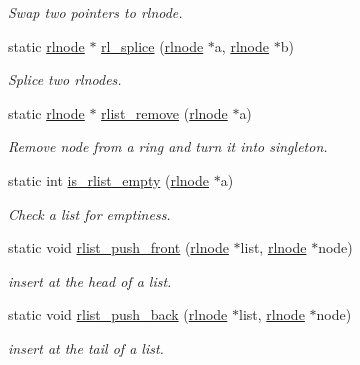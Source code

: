 \begin{DoxyCompactItemize}
\begin{DoxyCompactList}\small\item\em Swap two pointers to rlnode. \end{DoxyCompactList}\item 
static \hyperlink{group__rlists_ga8f6244877f7ce2322c90525217ea6e7a}{rlnode} $\ast$ \hyperlink{group__rlists_gac04dfecc68239457f673c0a63c254541}{rl\+\_\+splice} (\hyperlink{group__rlists_ga8f6244877f7ce2322c90525217ea6e7a}{rlnode} $\ast$a, \hyperlink{group__rlists_ga8f6244877f7ce2322c90525217ea6e7a}{rlnode} $\ast$b)
\begin{DoxyCompactList}\small\item\em Splice two rlnodes. \end{DoxyCompactList}\item 
static \hyperlink{group__rlists_ga8f6244877f7ce2322c90525217ea6e7a}{rlnode} $\ast$ \hyperlink{group__rlists_ga9177b286dcefd1d853aae220a98d3c7b}{rlist\+\_\+remove} (\hyperlink{group__rlists_ga8f6244877f7ce2322c90525217ea6e7a}{rlnode} $\ast$a)
\begin{DoxyCompactList}\small\item\em Remove node from a ring and turn it into singleton. \end{DoxyCompactList}\item 
static int \hyperlink{group__rlists_gaf60549214daf0df46bcd1a0d5ba5b661}{is\+\_\+rlist\+\_\+empty} (\hyperlink{group__rlists_ga8f6244877f7ce2322c90525217ea6e7a}{rlnode} $\ast$a)
\begin{DoxyCompactList}\small\item\em Check a list for emptiness. \end{DoxyCompactList}\item 
static void \hyperlink{group__rlists_ga63ab59e50f2007a6bfedb0180a73b06f}{rlist\+\_\+push\+\_\+front} (\hyperlink{group__rlists_ga8f6244877f7ce2322c90525217ea6e7a}{rlnode} $\ast$list, \hyperlink{group__rlists_ga8f6244877f7ce2322c90525217ea6e7a}{rlnode} $\ast$node)
\begin{DoxyCompactList}\small\item\em insert at the head of a list. \end{DoxyCompactList}\item 
static void \hyperlink{group__rlists_gac454004e8fb74ccd539e7fbd1affa86a}{rlist\+\_\+push\+\_\+back} (\hyperlink{group__rlists_ga8f6244877f7ce2322c90525217ea6e7a}{rlnode} $\ast$list, \hyperlink{group__rlists_ga8f6244877f7ce2322c90525217ea6e7a}{rlnode} $\ast$node)
\begin{DoxyCompactList}\small\item\em insert at the tail of a list. \end{DoxyCompactList}\item 

\end{DoxyCompactItemize}
